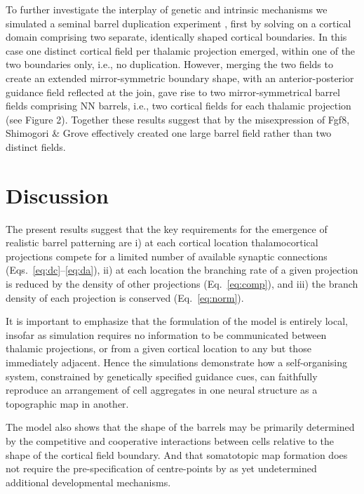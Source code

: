 \documentclass[9pt,twocolumn,twoside,lineno]{pnas-new}
\begin{document}
To further investigate the interplay of genetic and intrinsic mechanisms we simulated a seminal barrel duplication experiment \cite{shimogori_fibroblast_2005},  first by solving on a cortical domain comprising two separate, identically shaped cortical boundaries. In this case one distinct cortical field per thalamic projection emerged, within one of the two boundaries only, i.e., no duplication. However, merging the two fields to create an extended mirror-symmetric boundary shape, with an anterior-posterior guidance field reflected at the join, gave rise to two mirror-symmetrical barrel fields comprising NN barrels, i.e., two cortical fields for each thalamic projection (see Figure 2). Together these results suggest that by the misexpression of Fgf8, Shimogori \& Grove \citep{shimogori_fibroblast_2005} effectively created one large barrel field rather than two distinct fields.

\section*{Discussion}

The present results suggest that the key requirements for the emergence of realistic barrel patterning are i) at each cortical location thalamocortical projections compete for a limited number of available synaptic connections (Eqs.~\ref{eq:dc}--\ref{eq:da}), ii) at each location the branching rate of a given projection is reduced by the density of other projections (Eq.~\ref{eq:comp}), and iii) the branch density of each projection is conserved (Eq.~\ref{eq:norm}).

It is important to emphasize that the formulation of the model is entirely local, insofar as simulation requires no information to be communicated between thalamic projections, or from a given cortical location to any but those immediately adjacent. Hence the simulations demonstrate how a self-organising system, constrained by genetically specified guidance cues, can faithfully reproduce an arrangement of cell aggregates in one neural structure as a topographic map in another.

The model also shows that the shape of the barrels may be primarily determined by the competitive and cooperative interactions between cells relative to the shape of the cortical field boundary. And that somatotopic map formation does not require the pre-specification of centre-points by as yet undetermined additional developmental mechanisms.


\end{document}
